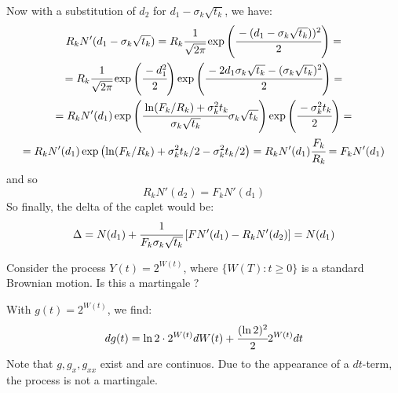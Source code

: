 \documentclass[12pt,a4paper]{exam}
\begin{document}
\begin{questions}
\begin{solution}
Now with a substitution of $d_2$ for $d_1-\sigma_k\sqrt{t_k}$, we have:
\begin{equation*}
\begin{gathered}
R_kN'(d_1 - \sigma_k\sqrt{t_k}) = R_k\cfrac{1}{\sqrt{2\pi}}\exp\left(\cfrac{-(d_1-\sigma_k\sqrt{t_k}))^2}{2}\right) = \\
= R_k\cfrac{1}{\sqrt{2\pi}}\exp\left(\cfrac{-d_1^2}{2}\right)\exp\left(\cfrac{-2d_1\sigma_k\sqrt{t_k}-(\sigma_k\sqrt{t_k})^2}{2}\right) = \\  = R_kN'(d_1)\exp\left(\cfrac{\ln(F_k/R_k)+\sigma_k^2t_k}{\sigma_k\sqrt{t_k}}\sigma_k\sqrt{t_k}\right)\exp\left(\cfrac{-\sigma_k^2t_k}{2}\right) = \\
=R_kN'(d_1)\exp\left(\ln(F_k/R_k)+\sigma^2_kt_k/2-\sigma^2_kt_k/2\right) = R_kN'(d_1)\cfrac{F_k}{R_k} = F_kN'(d_1)
\end{gathered}
\end{equation*}
and so
\begin{equation*}
	R_kN'(d_2)=F_kN'(d_1)
\end{equation*}
So finally, the delta of the caplet would be:
\begin{equation*}
\Delta = N(d_1) + \cfrac{1}{F_k\sigma_k\sqrt{t_k}}\left[FN'(d_1)-R_kN'(d_2)\right] =
N(d_1)
\end{equation*}
\end{solution}

\question Consider the process $Y(t) = 2^{W(t)}$, where $\{W(T):t\geq 0\}$ is a standard Brownian motion. Is this a martingale ?
\fillwithlines{3cm}
\begin{solution}
With $g(t)=2^{W(t)}$, we find:
\begin{equation*}
dg(t) = \ln2\cdot 2^{W(t)}dW(t) +\cfrac{(\ln2)^2}{2}2^{W(t)}dt
\end{equation*}
Note that $g, g_{x}, g_{xx}$ exist and are continuos. 
Due to the appearance of a $dt$-term, the process is not a martingale.
\end{solution}


\end{questions}
\end{document}
